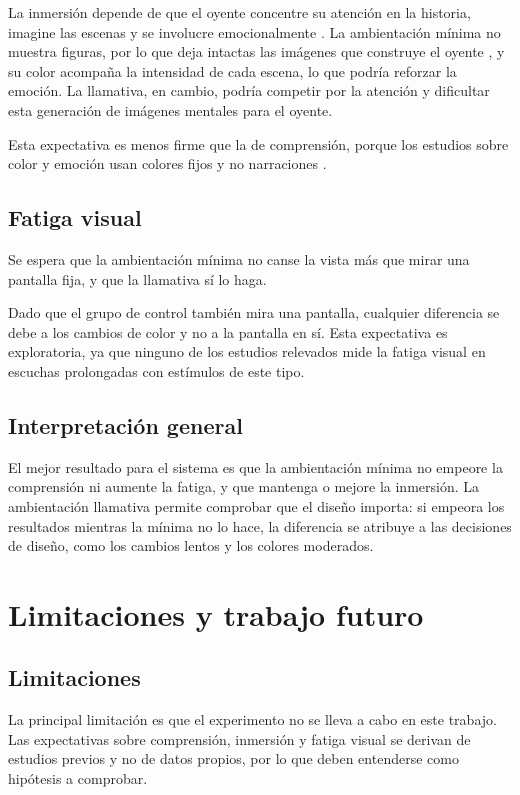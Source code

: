 \documentclass[journal]{IEEEtran}
\begin{document}
La inmersión depende de que el oyente concentre su atención en la historia, imagine las escenas y se involucre emocionalmente \cite{greenbrock2000}. La ambientación mínima no muestra figuras, por lo que deja intactas las imágenes que construye el oyente \cite{greenbrock2002}, y su color acompaña la intensidad de cada escena, lo que podría reforzar la emoción. La llamativa, en cambio, podría competir por la atención y dificultar esta generación de imágenes mentales para el oyente.
 
Esta expectativa es menos firme que la de comprensión, porque los estudios sobre color y emoción usan colores fijos y no narraciones \cite{wilmsoberfeld2018}.
 
\subsection{Fatiga visual}
Se espera que la ambientación mínima no canse la vista más que mirar una pantalla fija, y que la llamativa sí lo haga.
 
Dado que el grupo de control también mira una pantalla, cualquier diferencia se debe a los cambios de color y no a la pantalla en sí. Esta expectativa es exploratoria, ya que ninguno de los estudios relevados mide la fatiga visual en escuchas prolongadas con estímulos de este tipo.
 
\subsection{Interpretación general}
El mejor resultado para el sistema es que la ambientación mínima no empeore la comprensión ni aumente la fatiga, y que mantenga o mejore la inmersión. La ambientación llamativa permite comprobar que el diseño importa: si empeora los resultados mientras la mínima no lo hace, la diferencia se atribuye a las decisiones de diseño, como los cambios lentos y los colores moderados.
 
\section{Limitaciones y trabajo futuro}
 
\subsection{Limitaciones}
La principal limitación es que el experimento no se lleva a cabo en este trabajo. Las expectativas sobre comprensión, inmersión y fatiga visual se derivan de estudios previos y no de datos propios, por lo que deben entenderse como hipótesis a comprobar.
 
\end{document}
